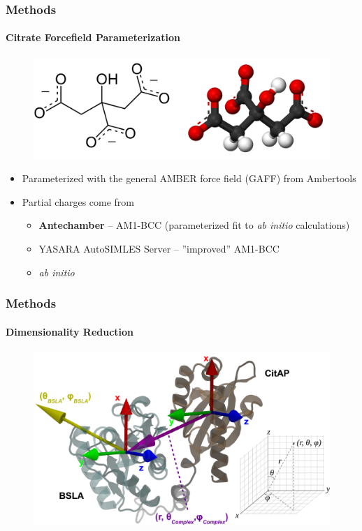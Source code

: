 \documentclass[english]{beamer}
\begin{document}
\begin{frame}
    \frametitle{Methods}
    \framesubtitle{Citrate Forcefield Parameterization}

    \begin{figure}
        \includegraphics[width=.7\linewidth]{figures/citrate.png}
    \end{figure}      

    \begin{itemize}
        \item Parameterized with the general AMBER force field (GAFF) from Ambertools
        \item Partial charges come from
        \begin{itemize}
            \item \textbf{Antechamber} -- AM1-BCC (parameterized fit to \textit{ab initio} calculations)
            \item YASARA AutoSIMLES Server -- ''improved'' AM1-BCC
            \item \textit{ab initio}
        \end{itemize}
    \end{itemize}
\end{frame}   


\begin{frame}
    \frametitle{Methods}
    \framesubtitle{Dimensionality Reduction}

    \begin{figure}
        \includegraphics[width=1.0\textwidth]{figures/Collective_coords/collective_coords.pdf}
    \end{figure}        

\end{frame}     
 
\end{document}
